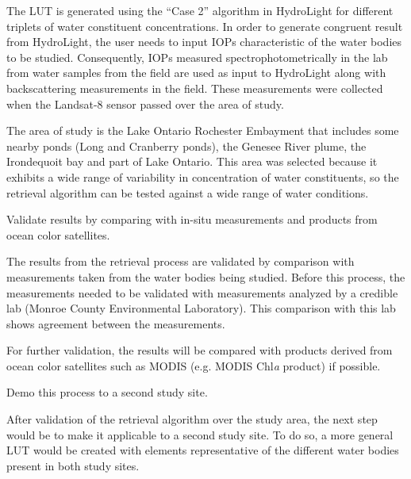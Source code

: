 \begin{enumerate}
The LUT is generated using the ``Case 2''  algorithm in HydroLight for different triplets of water constituent concentrations. In order to generate congruent result from HydroLight, the user needs to input IOPs characteristic of the water bodies to be studied. Consequently, IOPs measured spectrophotometrically in the lab from water samples from the field are used as input to HydroLight along with backscattering measurements in the field. These measurements were collected when the Landsat-8 sensor passed over the area of study.

The area of study is the Lake Ontario Rochester Embayment that includes some nearby ponds (Long and Cranberry ponds), the Genesee River plume, the Irondequoit bay and part of Lake Ontario. This area was selected because it exhibits a wide range of variability in concentration of water constituents, so the retrieval algorithm can be tested against a wide range of water conditions.
 
	{\bf \item Validate results by comparing with in-situ measurements and products from ocean color satellites.}

The results from the retrieval process are validated by comparison with measurements taken from the water bodies being studied. Before this process, the measurements needed to be validated with measurements analyzed by a credible lab (Monroe County Environmental Laboratory). This comparison with this lab shows agreement between the measurements. 

For further validation, the results will be compared with products derived from ocean color satellites such as MODIS (e.g. MODIS Chl{\it a} product) if possible.

	{\bf \item { Demo this process to a second study site}.}

After validation of the retrieval algorithm over the study area, the next step would be to make it applicable to a second study site. To do so, a more general LUT would be created with elements representative of the different water bodies present in both study sites.


\end{enumerate}


